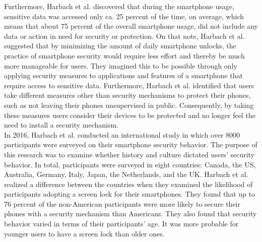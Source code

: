 Furthermore, Harbach et al. \cite{harbach} discovered that during the smartphone usage, sensitive data was accessed only ca. 25 percent of the time, on average, which means that about 75 percent of the overall smartphone usage, did not include any data or action in need for security or protection. On that note, Harbach et al. suggested that by minimizing the amount of daily smartphone unlocks, the practice of smartphone security would require less effort and thereby be much more manageable for users. They imagined this to be possible through only applying security measures to applications and features of a smartphone that require access to sensitive data. Furthermore, Harbach et al. \cite{harbach} identified that users take different measures other than security mechanisms to protect their phones, such as not leaving their phones unsupervised in public. Consequently, by taking these measures users consider their devices to be protected and no longer feel the need to install a security mechanism. \\

In 2016, Harbach et al. \cite{Harbach:2016} conducted an international study in which over 8000 participants were surveyed on their smartphone security behavior. The purpose of this research was to examine whether history and culture dictated users' security behavior. In total, participants were surveyed in eight countries: Canada, the US, Australia, Germany, Italy, Japan, the Netherlands, and the UK. Harbach et al. \cite{Harbach:2016} realized a difference between the countries when they examined the likelihood of participants adopting a screen lock for their smartphones. They found that up to 76 percent of the non-American participants were more likely to secure their phones with a security mechanism than Americans. They also found that security behavior varied in terms of their participants' age. It was more probable for younger users to have a screen lock than older ones.\\

